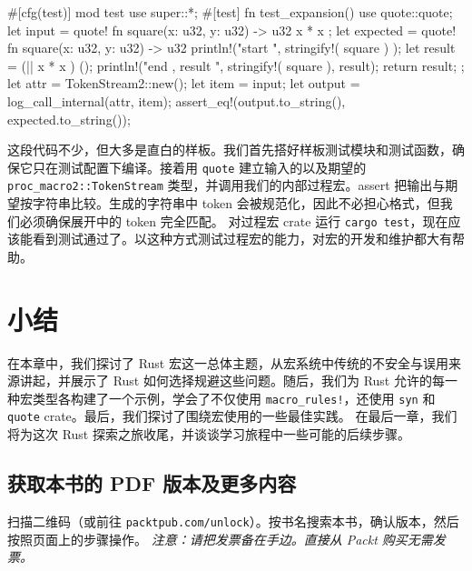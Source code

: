 \begin{codebox}[rust]
#[cfg(test)]
mod test {
    use super::*;
    #[test]
    fn test_expansion() {
        use quote::quote;
        let input = quote! {
            fn square(x: u32, y: u32) -> u32 { x * x }
        };
        let expected = quote! {
            fn square(x: u32, y: u32) -> u32 {
                println!("start {}", stringify!( square ) );
                let result = (|| { x * x }) ();
                println!("end {}, result {}", stringify!( square ), result);
                return result;
            }
        };
        let attr = TokenStream2::new();
        let item = input;
        let output = log_call_internal(attr, item);
        assert_eq!(output.to_string(), expected.to_string());
    }
}
\end{codebox}
\label{idx:idx_4bff7bfa}
\label{idx:idx_0e9e1ed0}
这段代码不少，但大多是直白的样板。我们首先搭好样板测试模块和测试函数，确保它只在测试配置下编译。接着用 \texttt{quote} 建立输入的以及期望的 \texttt{proc\_\allowbreak{}macro2::\allowbreak{}TokenStream} 类型，并调用我们的内部过程宏。assert 把输出与期望按字符串比较。生成的字符串中 token 会被规范化，因此不必担心格式，但我们必须确保展开中的 token 完全匹配。
\label{idx:idx_b121e272}
\label{idx:idx_9ad2b3b0}
对过程宏 crate 运行 \texttt{cargo test}，现在应该能看到测试通过了。以这种方式测试过程宏的能力，对宏的开发和维护都大有帮助。
\section{小结}
在本章中，我们探讨了 Rust 宏这一总体主题，从宏系统中传统的不安全与误用来源讲起，并展示了 Rust 如何选择规避这些问题。随后，我们为 Rust 允许的每一种宏类型各构建了一个示例，学会了不仅使用 \texttt{macro\_\allowbreak{}rules!}，还使用 \texttt{syn} 和 \texttt{quote} crate。最后，我们探讨了围绕宏使用的一些最佳实践。
在最后一章，我们将为这次 Rust 探索之旅收尾，并谈谈学习旅程中一些可能的后续步骤。
\begin{samepage}
\subsection{获取本书的 PDF 版本及更多内容}
扫描二维码（或前往 \texttt{packtpub.\allowbreak{}com/\allowbreak{}unlock}）。按书名搜索本书，确认版本，然后按照页面上的步骤操作。
\emph{注意：请把发票备在手边。直接从 Packt 购买无需发票。}
\end{samepage}
